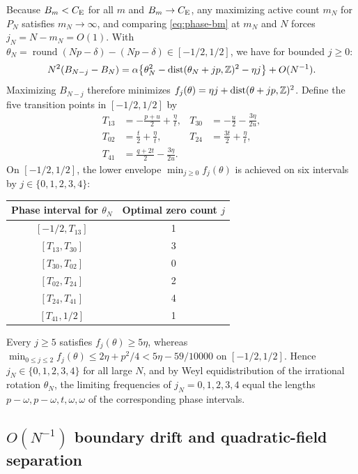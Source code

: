 Because $B_m<C_{\mathrm E}$ for all $m$ and $B_m\to C_{\mathrm E}$, any maximizing active count
$m_N$ for $P_N$ satisfies $m_N\to\infty$, and comparing \eqref{eq:phase-bm}
at $m_N$ and $N$ forces $j_N=N-m_N=O(1)$. With
$\theta_N=\operatorname{round}(Np-\delta)-(Np-\delta)\in[-1/2,1/2]$, we have
for bounded $j\ge0$:
\[
 N^2(B_{N-j}-B_N)=\alpha\bigl\{\theta_N^2-
 \operatorname{dist}(\theta_N+jp,\mathbb Z)^2-\eta j\bigr\}+O(N^{-1}).
\]
Maximizing $B_{N-j}$ therefore minimizes $f_j(\theta)=\eta j+\operatorname{dist}(\theta+jp,\mathbb Z)^2$.
Define the five transition points in $[-1/2,1/2]$ by
\begin{equation}\label{eq:phase-boundaries}
\begin{aligned}
 T_{13}&=-\frac{p+u}2+\frac\eta t,& T_{30}&=-\frac u2-\frac{3\eta}{2u},\\
 T_{02}&=\frac t2+\frac\eta t,&T_{24}&=\frac{3t}2+\frac\eta t,\\
 T_{41}&=\frac{q+2t}2-\frac{3\eta}{2u}.
\end{aligned}
\end{equation}
On $[-1/2,1/2]$, the lower envelope $\min_{j\ge0}f_j(\theta)$ is achieved on
six intervals by $j\in\{0,1,2,3,4\}$:
\begin{center}
\begin{tabular}{cc}
\toprule
Phase interval for $\theta_N$&Optimal zero count $j$\\
\midrule
$[-1/2,T_{13}]$&1\\
$[T_{13},T_{30}]$&3\\
$[T_{30},T_{02}]$&0\\
$[T_{02},T_{24}]$&2\\
$[T_{24},T_{41}]$&4\\
$[T_{41},1/2]$&1\\
\bottomrule
\end{tabular}
\end{center}
Every $j\ge5$ satisfies $f_j(\theta)\ge5\eta$, whereas $\min_{0\le j\le2}f_j(\theta)\le2\eta+p^2/4<5\eta-59/10000$
on $[-1/2,1/2]$. Hence $j_N\in\{0,1,2,3,4\}$ for all large $N$, and by Weyl
equidistribution of the irrational rotation $\theta_N$, the limiting
frequencies of $j_N=0,1,2,3,4$ equal the lengths
$p-\omega,p-\omega,t,\omega,\omega$ of the corresponding phase intervals.

\subsection{$O(N^{-1})$ boundary drift and quadratic-field separation}

